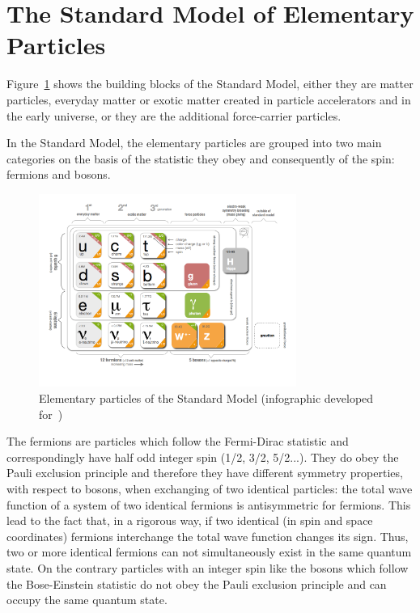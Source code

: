 \section{The Standard Model of Elementary Particles}
Figure~\ref{fig:SMfig} shows the building blocks of the Standard Model, either they are matter particles, everyday matter
or exotic matter created in particle accelerators and in the early universe, or they are the additional force-carrier particles.

In the Standard Model, the elementary particles are grouped into two main categories on the basis of the statistic they obey and consequently of the spin: fermions and bosons. 
\begin{figure}[h]
\centering
\includegraphics[clip,trim=1cm 2cm 2cm 1cm, width=0.75\textwidth]{Figures/c1/SMinfographic_image.png}
\caption{Elementary particles of the Standard Model (infographic
  developed for~\cite{particlefest})}
\label{fig:SMfig}
\end{figure}

The fermions are particles which follow the Fermi-Dirac statistic and correspondingly have half odd integer spin (1/2, 3/2, 5/2...). They do obey the Pauli exclusion principle and therefore they have different symmetry properties, with respect to bosons, when exchanging of two identical particles: the total wave function of a system of two identical fermions is antisymmetric for fermions. This lead to the fact that, in a rigorous way, if two identical (in spin and space coordinates) fermions interchange the total wave function changes its sign. Thus, two or more identical fermions can not simultaneously exist in the same quantum state. On the contrary particles with an integer spin like the bosons which follow the Bose-Einstein statistic do not obey the Pauli exclusion principle and can occupy the same quantum state. 

